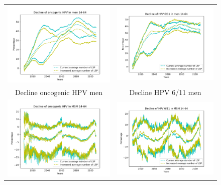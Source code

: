 \begin{figure}[!]
	\centering
	\begin{tabular}{cc}
		\includegraphics[width=0.5\linewidth]{IMGs/12.-Aumento_LSP/onco_hom.pdf}	& 
		\includegraphics[width=0.5\linewidth]{IMGs/12.-Aumento_LSP/verr_hom.pdf}  \\ 
		Decline oncogenic HPV men	& Decline HPV 6/11 men \\ 
		\includegraphics[width=0.5\linewidth]{IMGs/12.-Aumento_LSP/onco_MSM.pdf}	& 
		\includegraphics[width=0.5\linewidth]{IMGs/12.-Aumento_LSP/verr_MSM.pdf}  \\ 

\end{tabular}
\end{figure}
